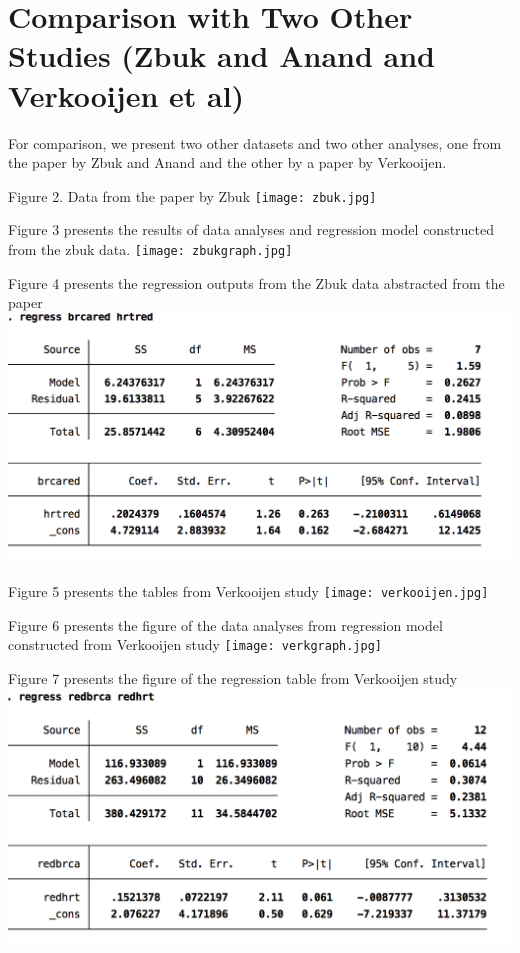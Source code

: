 \documentclass{article}
\begin{document}
\section*{Comparison with Two Other Studies (Zbuk and Anand and Verkooijen et al)}
\label{comparisonwithtwootherstudieszbukandanandandverkooijenetal}

For comparison, we present two other datasets and two other analyses, one from the paper by Zbuk and Anand and the other by a paper by Verkooijen. 

Figure 2. Data from the paper by Zbuk
\texttt{[image: zbuk.jpg]}


Figure 3 presents the results of data analyses and regression model constructed from the zbuk data.
\texttt{[image: zbukgraph.jpg]}


Figure 4 presents the regression outputs from the Zbuk data abstracted from the paper
\includegraphics[keepaspectratio,width=\textwidth,height=0.75\textheight]{zbukoutput.png}


Figure 5 presents the tables from Verkooijen study
\texttt{[image: verkooijen.jpg]}


Figure 6 presents the figure of the data analyses from regression model constructed from Verkooijen study
\texttt{[image: verkgraph.jpg]}


Figure 7 presents the figure of the regression table from Verkooijen study
\includegraphics[keepaspectratio,width=\textwidth,height=0.75\textheight]{verkoutput.png}
\end{document}
